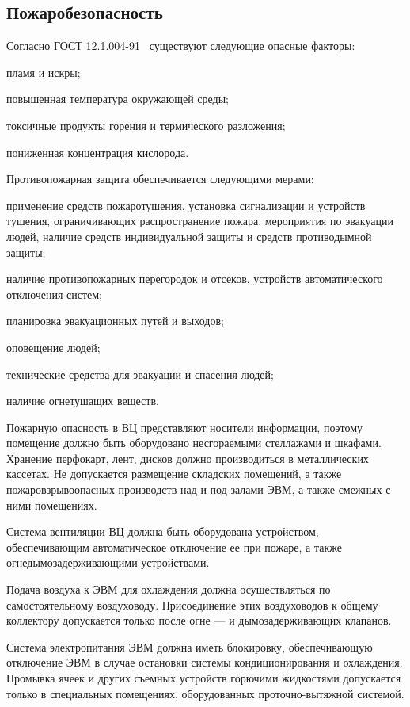 \subsection{Пожаробезопасность}
\label{sec:bgd:fire}
Согласно ГОСТ 12.1.004-91~\cite{BGDGost_12_1_004_91} существуют следующие опасные факторы:
\begin{compactitem}
\item пламя и искры;
\item повышенная температура окружающей среды;
\item токсичные продукты горения и термического разложения;
\item пониженная концентрация кислорода.
\end{compactitem}

Противопожарная защита обеспечивается следующими мерами:
\begin{compactitem}
\item применение средств пожаротушения, установка сигнализации и устройств тушения, ограничивающих распространение пожара, мероприятия по эвакуации людей, наличие средств индивидуальной защиты и средств противодымной защиты;
\item наличие противопожарных перегородок и отсеков, устройств автоматического отключения систем;
\item планировка эвакуационных путей и выходов;
\item оповещение людей;
\item технические средства для эвакуации и спасения людей;
\item наличие огнетушащих веществ.
\end{compactitem}

Пожарную опасность в ВЦ представляют носители информации, поэтому помещение должно быть оборудовано несгораемыми стеллажами и шкафами. Хранение перфокарт, лент, дисков должно производиться в металлических кассетах. Не допускается размещение складских помещений, а также пожаровзрывоопасных производств над и под залами ЭВМ, а также смежных с ними помещениях.

Система вентиляции ВЦ должна быть оборудована устройством, обеспечивающим автоматическое отключение ее при пожаре, а также огнедымозадерживающими устройствами.

Подача воздуха к ЭВМ для охлаждения должна осуществляться по самостоятельному воздуховоду. Присоединение этих воздуховодов к общему коллектору допускается только после огне --- и дымозадерживающих клапанов.

Система электропитания ЭВМ должна иметь блокировку, обеспечивающую отключение ЭВМ в случае остановки системы кондиционирования и охлаждения. Промывка ячеек и других съемных устройств горючими жидкостями допускается только в специальных помещениях, оборудованных проточно-вытяжной системой.

